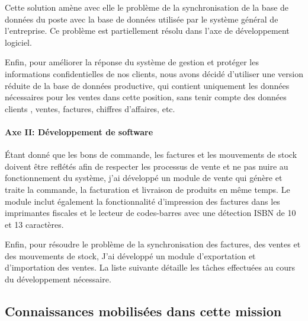 \documentclass{resume} %
\begin{document}
Cette solution amène avec elle le problème de la synchronisation de la base de données du poste avec la base de données utilisée par le système général de l'entreprise. Ce problème est partiellement résolu dans l'axe de développement logiciel.

Enfin, pour améliorer la réponse du système de gestion et protéger les informations confidentielles de nos clients, nous avons décidé d'utiliser une version réduite de la base de données productive, qui contient uniquement les données nécessaires pour les ventes dans cette position, sans tenir compte des données clients , ventes, factures, chiffres d'affaires, etc.

		\paragraph{Axe II: Développement de software}	
Étant donné que les bons de commande, les factures et les mouvements de stock doivent être reflétés afin de respecter les processus de vente et ne pas nuire au fonctionnement du système, j'ai développé un module de vente qui génère et traite la commande, la facturation et livraison de produits en même temps.
Le module inclut également la fonctionnalité d'impression des factures dans les imprimantes fiscales et le lecteur de codes-barres avec une détection ISBN de 10 et 13 caractères.

Enfin, pour résoudre le problème de la synchronisation des factures, des ventes et des mouvements de stock, J'ai développé un module d'exportation et d'importation des ventes.
La liste suivante détaille les tâches effectuées au cours du développement nécessaire.

	\subsection {Connaissances mobilisées dans cette mission }
\end{document}
